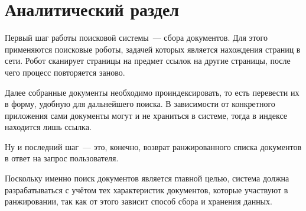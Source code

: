 \chapter{Аналитический раздел}
Первый шаг работы поисковой системы~--- сбора документов. Для этого применяются поисковые роботы, задачей которых является нахождения страниц в сети. Робот сканирует страницы на предмет ссылок на другие страницы, после чего процесс повторяется заново.

Далее собранные документы необходимо проиндексировать, то есть перевести их в форму, удобную для дальнейшего поиска. В зависимости от конкретного приложения сами документы могут и не храниться в системе, тогда в индексе находится лишь ссылка.

Ну и последний шаг~--- это, конечно, возврат ранжированного списка документов в ответ на запрос пользователя.

Поскольку именно поиск документов является главной целью, система должна разрабатываться с учётом тех характеристик документов, которые участвуют в ранжировании, так как от этого зависит способ сбора и хранения данных.




